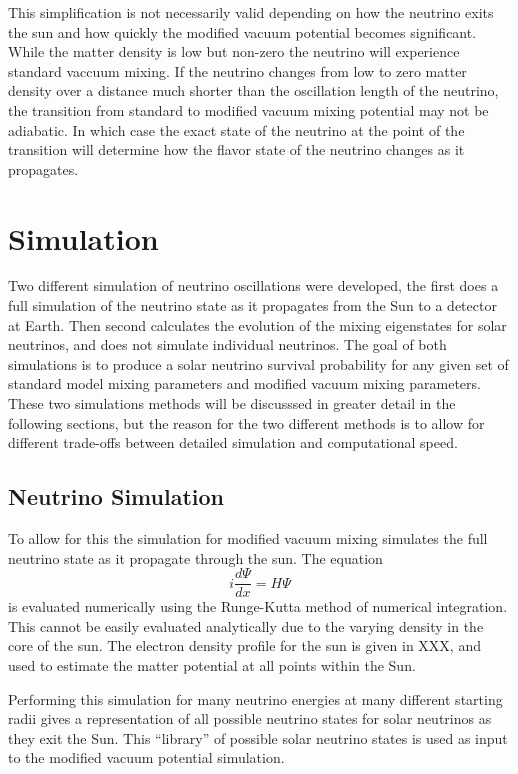 This simplification is not necessarily valid depending on how the neutrino
exits the sun and how quickly the modified vacuum potential becomes significant.
While the matter density is low but non-zero the neutrino will experience standard
vaccuum mixing. If the neutrino changes from low to zero matter density over
a distance much shorter than the oscillation length of the neutrino, the
transition from standard to modified vacuum mixing potential may not be adiabatic.
In which case the exact state of the neutrino at the point of the transition
will determine how the flavor state of the neutrino changes as it propagates.

\section{Simulation}
Two different simulation of neutrino oscillations were developed, the first
does a full simulation of the neutrino state as it propagates from the
Sun to a detector at Earth.
Then second calculates the evolution
of the mixing eigenstates for solar neutrinos, and does not simulate individual
neutrinos.
The goal of both simulations is to produce a solar neutrino survival probability
for any given set of standard model mixing parameters and modified vacuum
mixing parameters.
These two simulations methods will be discusssed in greater detail in the following sections,
but the reason for the two different methods is to allow for different
trade-offs between detailed simulation and computational speed.

\subsection{Neutrino Simulation}
To allow for this the simulation for modified vacuum mixing simulates the full
neutrino state as it propagate through the sun. The equation
\begin{equation}
    \label{eqn:mixing_schrodinger}
    i\frac{d\Psi}{dx} = H\Psi %
\end{equation}
is evaluated numerically using the Runge-Kutta method of numerical integration.
This cannot be easily evaluated analytically due to the varying density in the
core of the sun.
The electron density profile for the sun is given in XXX, and used to
estimate the matter potential at all points within the Sun.

Performing this simulation for many neutrino energies at many different starting
radii gives a representation of all possible neutrino states for solar neutrinos
as they exit the Sun. This ``library'' of possible solar neutrino states
is used as input to the modified vacuum potential simulation.

